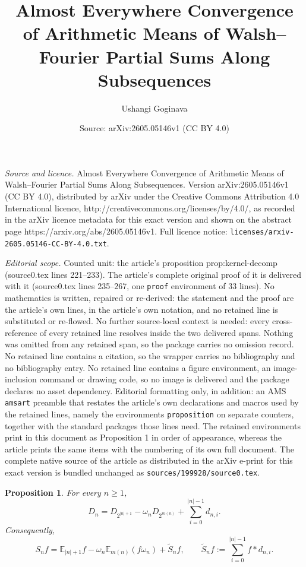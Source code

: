 \documentclass[10pt,a4paper]{amsart}
\title{Almost Everywhere Convergence of Arithmetic Means of Walsh--Fourier Partial Sums Along Subsequences}
\author{Ushangi Goginava}
\date{Source: arXiv:2605.05146v1 (CC BY 4.0)}
\newtheorem{proposition}{Proposition}
\begin{document}
\maketitle

\noindent\emph{Source and licence.} Almost Everywhere Convergence of Arithmetic Means of Walsh--Fourier Partial Sums Along Subsequences. Version arXiv:2605.05146v1 (CC BY 4.0), distributed by arXiv under the Creative Commons Attribution 4.0 International licence, http://creativecommons.org/licenses/by/4.0/, as recorded in the arXiv licence metadata for this exact version and shown on the abstract page https://arxiv.org/abs/2605.05146v1. Full licence notice: \texttt{licenses/arxiv-2605.05146-CC-BY-4.0.txt}.\par\smallskip

\noindent\textit{Editorial scope.} Counted unit: the article's proposition prop:kernel-decomp (source0.tex lines 221--233). The article's complete original proof of it is delivered with it (source0.tex lines 235--267, one \texttt{proof} environment of 33 lines). No mathematics is written, repaired or re-derived: the statement and the proof are the article's own lines, in the article's own notation, and no retained line is substituted or re-flowed.  No further source-local context is needed: every cross-reference of every retained line resolves inside the two delivered spans.  Nothing was omitted from any retained span, so the package carries no omission record.  No retained line contains a citation, so the wrapper carries no bibliography and no bibliography entry.  No retained line contains a figure environment, an image-inclusion command or drawing code, so no image is delivered and the package declares no asset dependency.  Editorial formatting only, in addition: an AMS \texttt{amsart} preamble that restates the article's own declarations and macros used by the retained lines, namely the environments \texttt{proposition} on separate counters, together with the standard packages those lines need.  The retained environments print in this document as Proposition 1 in order of appearance, whereas the article prints the same items with the numbering of its own full document.  The complete native source of the article as distributed in the arXiv e-print for this exact version is bundled unchanged as \texttt{sources/199928/source0.tex}.
\begin{proposition}
\label{prop:kernel-decomp} For every $n\ge1$, 
\begin{equation}
D_n = D_{2^{|n|+1}}-\omega_n D_{2^{m(n)}}+\sum_{i=0}^{|n|-1}d_{n,i}.
\label{eq:kernel-decomp}
\end{equation}
Consequently, 
\begin{equation}
S_n f =\mathbb{E}_{|n|+1}f-\omega_n\mathbb{E}_{m(n)}(f\omega_n)+\widetilde
S_n f, \qquad \widetilde S_n f:=\sum_{i=0}^{|n|-1} f*d_{n,i}.
\label{eq:partial-sum-decomp}
\end{equation}
\end{proposition}
\end{document}
